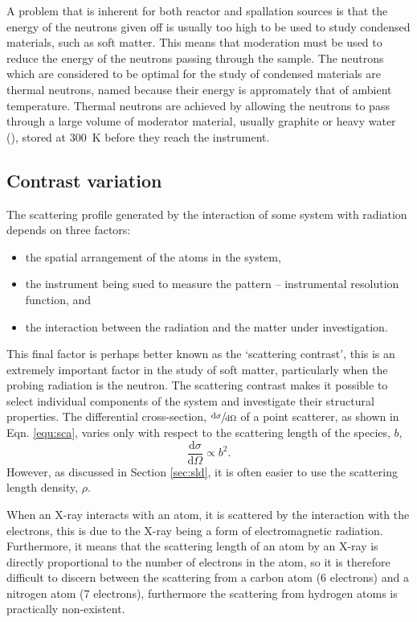 A problem that is inherent for both reactor and spallation sources is that the energy of the neutrons given off is usually too high to be used to study condensed materials, such as soft matter. This means that moderation must be used to reduce the energy of the neutrons passing through the sample. The neutrons which are considered to be optimal for the study of condensed materials are thermal neutrons, named because their energy is appromately that of ambient temperature. Thermal neutrons are achieved by allowing the neutrons to pass through a large volume of moderator material, usually graphite or heavy water (), stored at \SI{300}{\kelvin} before they reach the instrument.\cite{Sivia2011}

\subsection{Contrast variation}
\label{convar}

The scattering profile generated by the interaction of some system with radiation depends on three factors:
%
\begin{itemize}
	\item the spatial arrangement of the atoms in the system,
	\item the instrument being sued to measure the pattern -- instrumental resolution function, and
	\item the interaction between the radiation and the matter under investigation.
\end{itemize}
%
This final factor is perhaps better known as the `scattering contrast', this is an extremely important factor in the study of soft matter, particularly when the probing radiation is the neutron. The scattering contrast makes it possible to select individual components of the system and investigate their structural properties.\cite{Schurtenberger2002} The differential cross-section, $\sfrac{\text{d}\sigma}{\text{d}\Omega}$ of a point scatterer, as shown in Eqn. \ref{equ:sca}, varies only with respect to the scattering length of the species, $b$,
%
\begin{equation}
	\frac{\text{d}\sigma}{\text{d}\Omega} \propto b^2.
\end{equation}
%
However, as discussed in Section \ref{sec:sld}, it is often easier to use the scattering length density, $\rho$.

When an X-ray interacts with an atom, it is scattered by the interaction with the electrons, this is due to the X-ray being a form of electromagnetic radiation. Furthermore, it means that the scattering length of an atom by an X-ray is directly proportional to the number of electrons in the atom, so it is therefore difficult to discern between the scattering from a carbon atom (6 electrons) and a nitrogen atom (7 electrons), furthermore the scattering from hydrogen atoms is practically non-existent.

